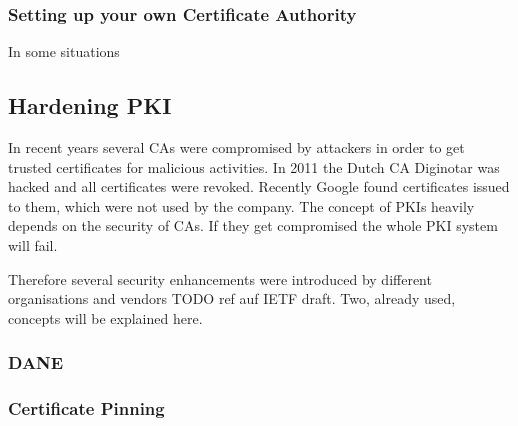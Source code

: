 \subsubsection{Setting up your own Certificate Authority}
\label{sec:setupownca}
In some situations 


\subsection{Hardening PKI}
\label{sec:hardeningpki}
In recent years several CAs were compromised by attackers in order to get trusted 
certificates for malicious activities. In 2011 the Dutch CA Diginotar was hacked and
all certificates were revoked. Recently Google found certificates issued to them, which
were not used by the company. The concept of PKIs heavily depends on the security of CAs. 
If they get compromised the whole PKI system will fail.

Therefore several security enhancements were introduced by different organisations and
vendors TODO ref auf IETF draft. Two, already used, concepts will be explained here.

\subsubsection{DANE}
\label{sec:dane}

\subsubsection{Certificate Pinning}
\label{sec:certpinning}







